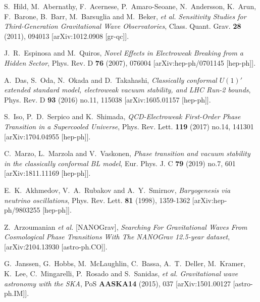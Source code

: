 \documentclass[a4paper,11pt]{article}
\begin{document}
\begin{thebibliography}{99}
S.~Hild, M.~Abernathy, F.~Acernese, P.~Amaro-Seoane, N.~Andersson, K.~Arun, F.~Barone, B.~Barr, M.~Barsuglia and M.~Beker, \textit{et al.}
{\em Sensitivity Studies for Third-Generation Gravitational Wave Observatories},
Class. Quant. Grav. \textbf{28} (2011), 094013
[arXiv:1012.0908 [gr-qc]].

J.~R.~Espinosa and M.~Quiros,
{\em Novel Effects in Electroweak Breaking from a Hidden Sector},
Phys. Rev. D \textbf{76} (2007), 076004
[arXiv:hep-ph/0701145 [hep-ph]].

A.~Das, S.~Oda, N.~Okada and D.~Takahashi,
{\em Classically conformal $U(1)'$ extended standard model, electroweak vacuum stability, and LHC Run-2 bounds},
Phys. Rev. D \textbf{93} (2016) no.11, 115038
[arXiv:1605.01157 [hep-ph]].

S.~Iso, P.~D.~Serpico and K.~Shimada,
{\em QCD-Electroweak First-Order Phase Transition in a Supercooled Universe},
Phys. Rev. Lett. \textbf{119} (2017) no.14, 141301
[arXiv:1704.04955 [hep-ph]].

C.~Marzo, L.~Marzola and V.~Vaskonen,
{\em Phase transition and vacuum stability in the classically conformal B\textendash{}L model},
Eur. Phys. J. C \textbf{79} (2019) no.7, 601
[arXiv:1811.11169 [hep-ph]].

E.~K.~Akhmedov, V.~A.~Rubakov and A.~Y.~Smirnov,
{\em Baryogenesis via neutrino oscillations},
Phys. Rev. Lett. \textbf{81} (1998), 1359-1362
[arXiv:hep-ph/9803255 [hep-ph]].

Z.~Arzoumanian \textit{et al.} [NANOGrav],
{\em Searching For Gravitational Waves From Cosmological Phase Transitions With The NANOGrav 12.5-year dataset},
[arXiv:2104.13930 [astro-ph.CO]].


G.~Janssen, G.~Hobbs, M.~McLaughlin, C.~Bassa, A.~T.~Deller, M.~Kramer, K.~Lee, C.~Mingarelli, P.~Rosado and S.~Sanidas, \textit{et al.}
{\em Gravitational wave astronomy with the SKA},
PoS \textbf{AASKA14} (2015), 037
[arXiv:1501.00127 [astro-ph.IM]].


\end{thebibliography}
\end{document}
